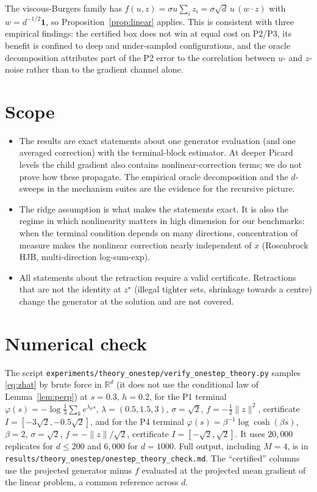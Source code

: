 \documentclass[11pt]{article}
\theoremstyle{remark}
\theoremstyle{definition}
\newcommand{\R}{\mathbb R}
\newcommand{\norm}[1]{\lVert #1\rVert}
\begin{document}
The viscous-Burgers family has $f(u,z)=\sigma u\sum_iz_i=\sigma\sqrt d\,u\,(w\cdot z)$
with $w=d^{-1/2}\mathbf 1$, so Proposition~\ref{prop:linear} applies. This is consistent
with three empirical findings: the certified box does not win at equal cost on P2/P3,
its benefit is confined to deep and under-sampled configurations, and the oracle
decomposition attributes part of the P2 error to the correlation between $u$- and
$z$-noise rather than to the gradient channel alone.

\section{Scope}

\begin{itemize}
\item The results are exact statements about one generator evaluation (and one averaged
correction) with the terminal-block estimator. At deeper Picard levels the child gradient
also contains nonlinear-correction terms; we do not prove how these propagate. The
empirical oracle decomposition and the $d$-sweeps in the mechanism suites are the
evidence for the recursive picture.
\item The ridge assumption is what makes the statements exact. It is also the regime in
which nonlinearity matters in high dimension for our benchmarks: when the terminal
condition depends on many directions, concentration of measure makes the nonlinear
correction nearly independent of $x$ (Rosenbrock HJB, multi-direction log-sum-exp).
\item All statements about the retraction require a valid certificate. Retractions that
are not the identity at $z^\star$ (illegal tighter sets, shrinkage towards a centre)
change the generator at the solution and are not covered.
\end{itemize}

\section{Numerical check}

The script \texttt{experiments/theory\_onestep/verify\_onestep\_theory.py} samples
\eqref{eq:zhat} by brute force in $\R^d$ (it does not use the conditional law of
Lemma~\ref{lem:perp}) at $s=0.3$, $h=0.2$, for the P1 terminal
$\varphi(s)=-\log\tfrac13\sum_k e^{\lambda_k s}$, $\lambda=(0.5,1.5,3)$,
$\sigma=\sqrt2$, $f=-\tfrac12\norm z^2$, certificate
$I=[-3\sqrt2,-0.5\sqrt2]$, and for the P4 terminal $\varphi(s)=\beta^{-1}\log\cosh(\beta s)$,
$\beta=2$, $\sigma=\sqrt2$, $f=-\norm z/\sqrt2$, certificate $I=[-\sqrt2,\sqrt2]$.
It uses $20{,}000$ replicates for $d\le200$ and $6{,}000$ for $d=1000$.
Full output, including $M=4$, is in
\texttt{results/theory\_onestep/onestep\_theory\_check.md}.
The ``certified'' columns use the projected generator minus $f$ evaluated at the
projected mean gradient of the linear problem, a common reference across $d$.
\end{document}
